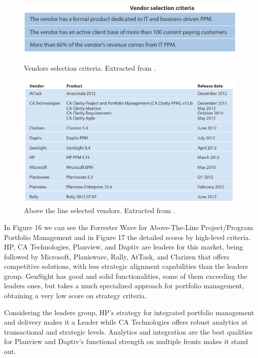 \begin{figure}[h!]
\begin{minipage}[h!]{0.45\linewidth}
\centering
\includegraphics[width=\textwidth]{img/AboveLineCriteria.png}
\caption{Vendors selection criteria. Extracted from \cite{forresterWavePPM}.}
\label{fig:figure1}
\end{minipage}
\hspace{0.5cm}
\begin{minipage}[h!]{0.55\linewidth}
\centering
\includegraphics[width=\textwidth]{img/AboveLineVendors.png}
\caption{Above the line selected vendors. Extracted from \cite{forresterWavePPM}.}
\label{fig:figure2}
\end{minipage}
\end{figure}

In Figure 16 we can see the Forrester Wave for Above-The-Line Project/Program Portfolio Management and in Figure 17 the detailed scores by high-level criteria. HP, CA Technologies, Planview, and Daptiv are leaders for this market, being followed by Microsoft, Planisware, Rally, AtTask, and Clarizen that offers competitive solutions, with less strategic alignment capabilities than the leaders group. GenSight has good and solid functionalities, some of them exceeding the leaders ones, but takes a much specialized approach for portfolio management, obtaining a very low score on strategy criteria.\par
Considering the leaders group, HP's strategy for integrated portfolio management and delivery makes it a Leader while CA Technologies offers robust analytics at transactional and strategic levels. Analytics and integration are the best qualities for Planview and Daptiv's functional strength on multiple fronts makes it stand out.\par


